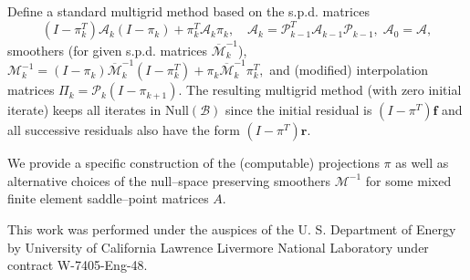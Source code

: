 \documentclass{report}
\begin{document}
Define a standard multigrid method based on the s.p.d. matrices
$$
(I-\pi^T_k){\mathcal A}_k(I-\pi_k) + \pi^T_k {\mathcal A}_k \pi_k,
\quad {\mathcal A}_k =
{\mathcal P}^T_{k-1} {\mathcal A}_{k-1} {\mathcal P}_{k-1},\;
{\mathcal A}_0 = {\mathcal A},
$$
smoothers (for given s.p.d. matrices ${\overline {\mathcal
M}}^{-1}_k$),${\mathcal M}^{-1}_k = (I-\pi_k){\overline {\mathcal
M}}^{-1}_k(I-\pi^T_k)+ \pi_k {\overline {\mathcal M}}^{-1}_k\pi^T_k,
$
and (modified) interpolation matrices $\Pi_k={\mathcal P}_k (I-\pi_{k+1}).$
The resulting multigrid method (with zero initial iterate)
keeps all iterates in $\text{Null}({\mathcal B})$ since the initial
residual is $(I-\pi^T){\mathbf f}$ and all successive residuals also have
the form $(I-\pi^T){\mathbf r}$.

We provide a specific construction of the (computable) projections $\pi$
as well as alternative choices of the null--space preserving smoothers
${\mathcal M}^{-1}$
for some mixed finite element saddle--point matrices $A$.

This work was performed under the auspices of the U. S. Department of
Energy by University of California Lawrence Livermore National Laboratory
under contract W-7405-Eng-48.
\end{document}
